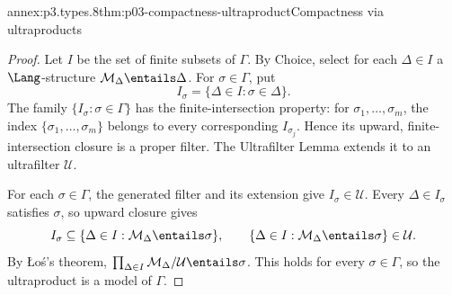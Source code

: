 \begin{annexitem}{annex:p3.types.8}{thm:p03-compactness-ultraproduct}{Compactness via ultraproducts}
\begin{proof}
Let \(I\) be the set of finite subsets of \(\Gamma\).  By Choice, select for
each \(\Delta\in I\) a \(\Lang\)-structure
\(\mathcal M_\Delta\entails\Delta\).  For \(\sigma\in\Gamma\), put
\[
 I_\sigma=\{\Delta\in I:\sigma\in\Delta\}.
\]
The family \(\{I_\sigma:\sigma\in\Gamma\}\) has the finite-intersection
property: for \(\sigma_1,\ldots,\sigma_m\), the index
\(\{\sigma_1,\ldots,\sigma_m\}\) belongs to every corresponding
\(I_{\sigma_j}\).  Hence its upward, finite-intersection closure is a proper
filter.  The Ultrafilter Lemma extends it to an ultrafilter \(\mathcal U\).

For each \(\sigma\in\Gamma\), the generated filter and its extension give
\(I_\sigma\in\mathcal U\).  Every \(\Delta\in I_\sigma\) satisfies \(\sigma\),
so upward closure gives
\[
 I_\sigma\subseteq
 \{\Delta\in I:\mathcal M_\Delta\entails\sigma\},
 \qquad
 \{\Delta\in I:\mathcal M_\Delta\entails\sigma\}\in\mathcal U.
\]
By \L o\'s's theorem,
\(\prod_{\Delta\in I}\mathcal M_\Delta/\mathcal U\entails\sigma\).
This holds for every \(\sigma\in\Gamma\), so the ultraproduct is a model of
\(\Gamma\).
\end{proof}
\end{annexitem}

